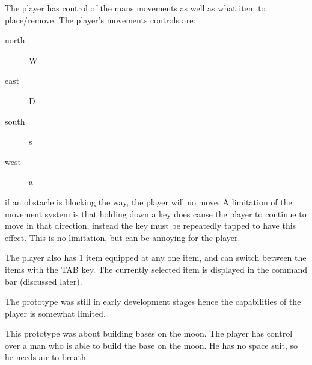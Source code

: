 The player has control of the mans movements as well as what item to place/remove.
The player's movements controls are:
\begin{description}
\item [north] W
\item [east] D
\item [south] s
\item [west] a
\end{description}
if an obstacle is blocking the way, the player will no move.
A limitation of the movement system is that holding down a key does cause the player to continue to move in that direction, instead the key must be repeatedly tapped to have this effect. This is no limitation, but can be annoying for the player.

The player also has 1 item equipped at any one item, and can switch between the items with the TAB key. The currently selected item is displayed in the command bar (discussed later).



The prototype was still in early development stages hence the capabilities of the player is somewhat limited.


This prototype was about building bases on the moon.
The player has control over a man who is able to build the base on the moon.
He has no space suit, so he needs air to breath.

